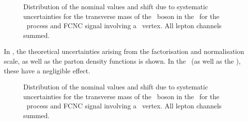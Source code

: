 \begin{figure}[htbp]
{	}
	\caption{Distribution of the nominal values and shift due to systematic uncertainties for the transverse mass of the \PW\ boson in the \STSR\ for the \WZ\ process and FCNC signal involving a \Zut\ vertex. All lepton channels summed. }
	\label{fig:shiftBDTSTZut}
\end{figure}

In , the theoretical uncertainties arising from the factorisation and normalisation scale, as well as the parton density functions is shown. In the \STSR\ (as well as the \TTSR), these have a negligible effect. 
\begin{figure}[htbp] 
	\centering 
	
	\caption{Distribution of the nominal values and shift due to systematic uncertainties for the transverse mass of the \PW\ boson in the \STSR\ for the \WZ\ process and FCNC signal involving a \Zut\ vertex. All lepton channels summed. }
	\label{fig:shiftBDTSTZut1}
\end{figure}

